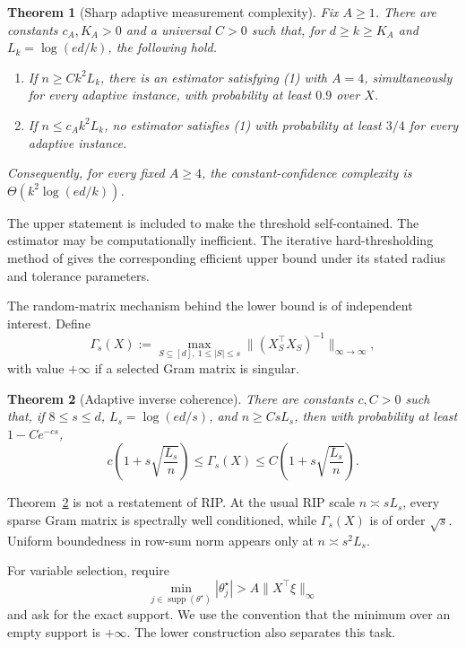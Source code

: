 \documentclass[twoside]{article}
\newtheorem{theorem}{Theorem}
\newcommand{\supp}{\operatorname{supp}}
\begin{document}
\begin{theorem}[Sharp adaptive measurement complexity]
\label{thm:complexity}
Fix $A\geq1$. There are constants $c_A,K_A>0$ and a universal $C>0$ such that, for
$d\geq k\geq K_A$ and $L_k=\log(ed/k)$, the following hold.
\begin{enumerate}
\item If $n\geq Ck^2L_k$, there is an estimator satisfying (1) with
$A=4$, simultaneously for every adaptive instance, with probability at least
$0.9$ over $X$.
\item If $n\leq c_Ak^2L_k$, no estimator satisfies (1) with probability at
least $3/4$ for every adaptive instance.
\end{enumerate}
Consequently, for every fixed $A\geq4$, the constant-confidence complexity is
$\Theta(k^2\log(ed/k))$.
\end{theorem}

The upper statement is included to make the threshold self-contained. The
estimator may be computationally inefficient. The iterative hard-thresholding
method of \citet{chen2026adaptive} gives the corresponding efficient upper
bound under its stated radius and tolerance parameters.

The random-matrix mechanism behind the lower bound is of independent interest.
Define
\[
 \Gamma_s(X):=
 \max_{S\subseteq[d],\ 1\leq |S|\leq s}
 \|(X_S^\top X_S)^{-1}\|_{\infty\to\infty},
 \tag{2}
\]
with value $+\infty$ if a selected Gram matrix is singular.

\begin{theorem}[Adaptive inverse coherence]
\label{thm:inverse}
There are constants $c,C>0$ such that, if $8\leq s\leq d$,
$L_s=\log(ed/s)$, and $n\geq CsL_s$, then with probability at least
$1-Ce^{-cs}$,
\[
 c\left(1+s\sqrt{\frac{L_s}{n}}\right)
 \leq \Gamma_s(X)
 \leq
 C\left(1+s\sqrt{\frac{L_s}{n}}\right).
 \tag{3}
\]
\end{theorem}

Theorem~\ref{thm:inverse} is not a restatement of RIP. At the usual RIP scale
$n\asymp sL_s$, every sparse Gram matrix is spectrally well conditioned, while
$\Gamma_s(X)$ is of order $\sqrt{s}$. Uniform boundedness in row-sum norm
appears only at $n\asymp s^2L_s$.

For variable selection, require
\[
 \min_{j\in\supp(\theta^\star)}|\theta_j^\star|
 >A\|X^\top\xi\|_\infty
 \tag{4}
\]
and ask for the exact support. We use the convention that the minimum over an
empty support is $+\infty$. The lower construction also separates this task.
\end{document}
